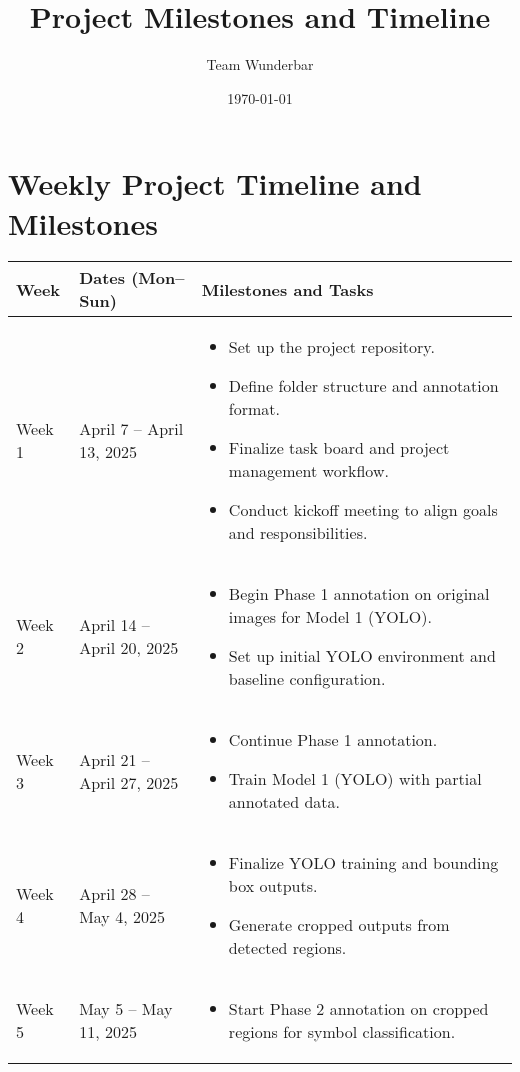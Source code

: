 \documentclass{article}
\title{Project Milestones and Timeline}
\author{Team Wunderbar}
\date{\today}
\begin{document}
\maketitle

\section*{Weekly Project Timeline and Milestones}

\begin{longtable}{|p{2.5cm}|p{4.2cm}|p{8.5cm}|}
\hline
\textbf{Week} & \textbf{Dates (Mon–Sun)} & \textbf{Milestones and Tasks} \\
\hline
Week 1 & April 7 -- April 13, 2025 &
\begin{itemize}
    \item Set up the project repository.
    \item Define folder structure and annotation format.
    \item Finalize task board and project management workflow.
    \item Conduct kickoff meeting to align goals and responsibilities.
\end{itemize} \\
\hline
Week 2 & April 14 -- April 20, 2025 &
\begin{itemize}
    \item Begin Phase 1 annotation on original images for Model 1 (YOLO).
    \item Set up initial YOLO environment and baseline configuration.
\end{itemize} \\
\hline
Week 3 & April 21 -- April 27, 2025 &
\begin{itemize}
    \item Continue Phase 1 annotation.
    \item Train Model 1 (YOLO) with partial annotated data.
\end{itemize} \\
\hline
Week 4 & April 28 -- May 4, 2025 &
\begin{itemize}
    \item Finalize YOLO training and bounding box outputs.
    \item Generate cropped outputs from detected regions.
\end{itemize} \\
\hline
Week 5 & May 5 -- May 11, 2025 &
\begin{itemize}
    \item Start Phase 2 annotation on cropped regions for symbol classification.

\end{itemize}
\end{longtable}
\end{document}
